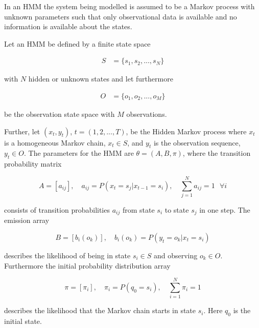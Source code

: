 In an \ac{HMM} the system being modelled is assumed to be a Markov process with unknown parameters such that only observational data is available and no information is available about the states.


Let an \ac{HMM} be defined by a finite state space 

\begin{align}
    S &= \{s_1, s_2, ..., s_N\}
\end{align}

with $N$ hidden or unknown states and let furthermore

\begin{align}
    O &= \{o_1, o_2, ..., o_M\} 
\end{align}

be the observation state space with $M$ observations. 

Further, let $(x_t, y_t)$, $t = (1, 2, ..., T)$, be the Hidden Markov process where $x_t$ is a homogeneous Markov chain, $x_t \in S$, and $y_t$ is the observation sequence, $y_t \in O$. The parameters for the \ac{HMM} are $\theta = (A, B, \pi)$, where the transition probability matrix 

\begin{equation}
    A = [a_{ij}], \quad a_{ij} = P(x_t = s_j | x_{t-1} = s_i), \quad \sum_{j=1}^N a_{ij} = 1 \text{  } \forall i
\end{equation}

consists of transition probabilities $a_{ij}$ from state $s_i$ to state $s_j$ in one step. The emission array 

\begin{equation}
    B = [b_i(o_k)], \quad b_i(o_k) = P(y_t = o_k | x_t = s_i)
\end{equation}

describes the likelihood of being in state $s_i \in S$ and observing $o_k \in O$. Furthermore the initial probability distribution array 

\begin{equation}
    \pi = [\pi_i], \quad \pi_i = P(q_0 = s_i), \quad \sum_{i=1}^N \pi_i = 1 
\end{equation}

describes the likelihood that the Markov chain starts in state $s_i$. Here $q_0$ is the initial state.

